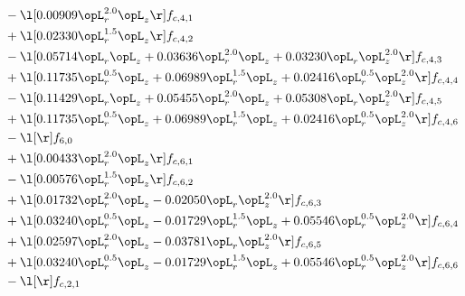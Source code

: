 \begin{alignat}{2}
& - \l[  0.00909 \opL_r^{2.0} \opL_z  \r] f_{c,4,1} \nonumber \\ 
& + \l[  0.02330 \opL_r^{1.5} \opL_z  \r] f_{c,4,2} \nonumber \\ 
& - \l[  0.05714 \opL_r \opL_z +  0.03636 \opL_r^{2.0} \opL_z +  0.03230 \opL_r \opL_z^{2.0}  \r] f_{c,4,3} \nonumber \\ 
& + \l[  0.11735 \opL_r^{0.5} \opL_z +  0.06989 \opL_r^{1.5} \opL_z +  0.02416 \opL_r^{0.5} \opL_z^{2.0}  \r] f_{c,4,4} \nonumber \\ 
& - \l[  0.11429 \opL_r \opL_z +  0.05455 \opL_r^{2.0} \opL_z +  0.05308 \opL_r \opL_z^{2.0}  \r] f_{c,4,5} \nonumber \\ 
& + \l[  0.11735 \opL_r^{0.5} \opL_z +  0.06989 \opL_r^{1.5} \opL_z +  0.02416 \opL_r^{0.5} \opL_z^{2.0}  \r] f_{c,4,6} \nonumber \\ 
& - \l[  \r] f_{6,0} \nonumber \\ 
& + \l[  0.00433 \opL_r^{2.0} \opL_z  \r] f_{c,6,1} \nonumber \\ 
& - \l[  0.00576 \opL_r^{1.5} \opL_z  \r] f_{c,6,2} \nonumber \\ 
& + \l[  0.01732 \opL_r^{2.0} \opL_z   -0.02050 \opL_r \opL_z^{2.0}  \r] f_{c,6,3} \nonumber \\ 
& + \l[  0.03240 \opL_r^{0.5} \opL_z   -0.01729 \opL_r^{1.5} \opL_z +  0.05546 \opL_r^{0.5} \opL_z^{2.0}  \r] f_{c,6,4} \nonumber \\ 
& + \l[  0.02597 \opL_r^{2.0} \opL_z   -0.03781 \opL_r \opL_z^{2.0}  \r] f_{c,6,5} \nonumber \\ 
& + \l[  0.03240 \opL_r^{0.5} \opL_z   -0.01729 \opL_r^{1.5} \opL_z +  0.05546 \opL_r^{0.5} \opL_z^{2.0}  \r] f_{c,6,6} \nonumber \\ 
& - \l[  \r] f_{c,2,1} \nonumber \\ 
\end{alignat} 


